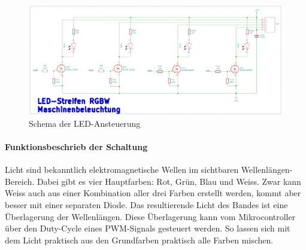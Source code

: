 \begin{figure}[!h]
\center
\includegraphics[width =  \textwidth]{graphics/Schema_LED}
\caption{Schema der LED-Ansteuerung}
\label{fig:Schema_LED}
\end{figure}
\newpage
\paragraph{Funktionsbeschrieb der Schaltung}\mbox{}

Licht sind bekanntlich elektromagnetische Wellen im sichtbaren Wellenlängen-Bereich. Dabei gibt es vier Hauptfarben: Rot, Grün, Blau und Weiss. Zwar kann Weiss auch aus einer Kombination aller drei Farben erstellt werden, kommt aber besser mit einer separaten Diode. Das resultierende Licht des Bandes ist eine Überlagerung der Wellenlängen. Diese Überlagerung kann vom Mikrocontroller über den Duty-Cycle eines PWM-Signals gesteuert werden. So lassen sich mit dem Licht praktisch aus den Grundfarben praktisch alle Farben mischen.